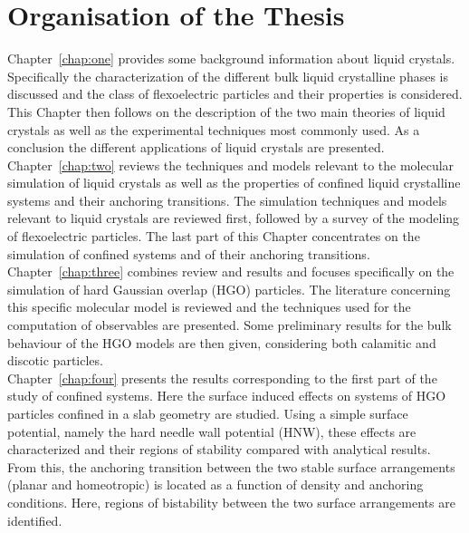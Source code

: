 

\section{Organisation of the Thesis}

Chapter~\ref{chap:one} provides some background information about liquid crystals. Specifically the
characterization of the different bulk liquid crystalline phases is discussed and the class of
flexoelectric particles and their properties is considered. This Chapter then follows on
the description of the two main theories of liquid crystals as well as the experimental
techniques most commonly used. As a conclusion the different applications of liquid crystals are
presented.\\

Chapter~\ref{chap:two} reviews the techniques and models relevant to the molecular simulation of
liquid crystals as well as the properties of confined liquid crystalline systems and their
anchoring transitions. The simulation techniques and models relevant to liquid crystals are
reviewed first, followed by a survey of the modeling of flexoelectric particles. The last part
of this Chapter concentrates on the simulation of confined systems and of their anchoring
transitions.\\

Chapter~\ref{chap:three} combines review and results and focuses specifically on the
simulation of hard Gaussian overlap (HGO) particles. The literature concerning this
specific molecular model is reviewed and the techniques used for the computation
of observables are presented. Some preliminary results for the bulk behaviour of the HGO
models are then given, considering both calamitic and discotic particles.\\


Chapter~\ref{chap:four} presents the results corresponding to
the first part of the study of confined systems. Here the surface induced
effects on systems of HGO particles confined in a slab geometry are studied.
Using a simple surface potential, namely the hard needle wall potential (HNW), these effects are
characterized and their regions of stability compared with analytical results. From this, the
anchoring transition between the two stable surface arrangements (planar and homeotropic) is
located as a function of density and anchoring conditions. Here, regions of bistability between the
two surface arrangements are identified.\\

